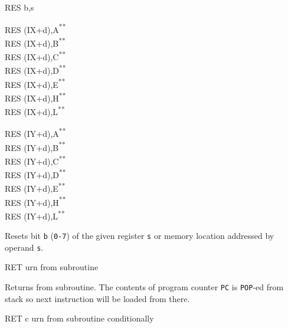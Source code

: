 \documentclass[12pt,twoside,openright,a4paper]{book}
\newcommand{\UNDOC}{\textnormal{\textsuperscript{**}}}
\begin{document}
\begin{basedescript}{
	\desclabelstyle{\multilinelabel}
	\desclabelwidth{3cm}}
\begin{DetailItem}{RES b,s}
\begin{DetailVariants}
			\columnbreak
			RES (IX+d),A\UNDOC\\
			RES (IX+d),B\UNDOC\\
			RES (IX+d),C\UNDOC\\
			RES (IX+d),D\UNDOC\\
			RES (IX+d),E\UNDOC\\
			RES (IX+d),H\UNDOC\\
			RES (IX+d),L\UNDOC

			\columnbreak
			RES (IY+d),A\UNDOC\\
			RES (IY+d),B\UNDOC\\
			RES (IY+d),C\UNDOC\\
			RES (IY+d),D\UNDOC\\
			RES (IY+d),E\UNDOC\\
			RES (IY+d),H\UNDOC\\
			RES (IY+d),L\UNDOC
		\end{DetailVariants}

		Resets bit {\tt b} ({\tt 0-7}) of the given register {\tt s} or memory location addressed by operand {\tt s}.

		\DetailNoEffect
						
		\begin{DetailTiming}
		\end{DetailTiming}

	\end{DetailItem}

	\pagebreak
	\begin{DetailItem}{RET}
		{urn from subroutine}
		{\SymRET}

		Returns from subroutine. The contents of program counter {\tt PC} is {\tt POP}-ed from stack so next instruction will be loaded from there.

		\DetailNoEffect
				
		\begin{DetailTiming}
			\DetailTime{}{3}{10}
		\end{DetailTiming}

	\end{DetailItem}

	\begin{DetailItem}{RET c}
		{urn from subroutine conditionally}
		{\SymRETc{c}}


\end{DetailItem}
\end{basedescript}
\end{document}
